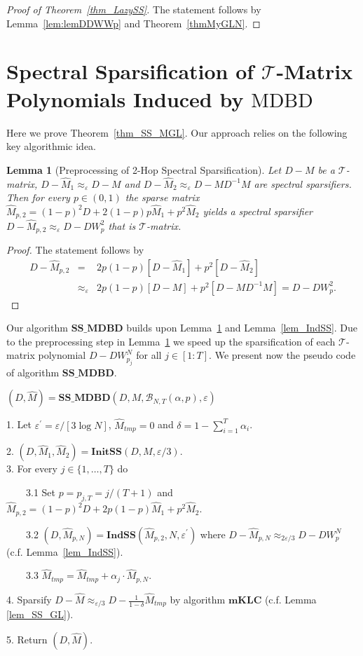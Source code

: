 \documentclass[11pt]{article}
\newcommand{\MDBD}{\mathrm{MDBD}}
\newcommand{\GL}{\mathcal{T}}
\newcommand{\BNTap}{\mathcal{B}_{N,T}(\alpha,p)}
\newcommand{\mKLC}{\mathrm{\mathbf{mKLC}}}
\newcommand{\InitSS}{\mathrm{\mathbf{InitSS}}}
\newcommand{\IndSS}{\mathrm{\mathbf{IndSS}}}
\newcommand{\SSMDBD}{\mathrm{\mathbf{SS\_MDBD}}}
\newcommand{\hM}{\widehat{M}}
\newcommand{\Di}{D^{-1}}
\newcommand{\prm}{\prime}
\newcommand{\eps}{\epsilon}
\newcommand{\lemref}[1]{Lemma~\ref{lem:#1}}
\renewcommand{\eps}{\varepsilon}
\newtheorem{lem}[thm]{Lemma}
\numberwithin{thm}{section}
\begin{document}
\begin{proof}[Proof of Theorem~\ref{thm_LazySS}] The statement follows by \lemref{lemDDWWp} and Theorem~\ref{thmMyGLN}.
\end{proof}


\section{Spectral Sparsification of $\GL$-Matrix Polynomials Induced by $\MDBD$}\label{sec:SSGLBM}

Here we prove Theorem~\ref{thm_SS_MGL}. Our approach relies on the following key algorithmic idea.

\begin{lem}[Preprocessing of 2-Hop Spectral Sparsification]\label{lem_DMp2}
Let $D-M$ be a $\GL$-matrix, $D-\hM_{1}\approx_{\eps}D-M$ and $D-\hM_{2}\approx_{\eps}D-M\Di M$ are spectral sparsifiers. Then for every $p\in(0,1)$ the sparse matrix $\hM_{p,2}=(1-p)^{2}D+2(1-p)p\hM_{1}+p^{2}\hM_{2}$ yields a spectral sparsifier $D-\hM_{p,2}\approx_{\eps}D-DW_{p}^{2}$ that is $\GL$-matrix.
\end{lem}

\begin{proof}
The statement follows by
\begin{eqnarray*}
  D-\hM_{p,2} & = & 2p(1-p)[D-\hM_{1}]+p^{2}[D-\hM_{2}]\\
  & \approx_{\eps} & 2p(1-p)[D-M]+p^{2}[D-M\Di M]=D-DW_{p}^{2}.
\end{eqnarray*}
\end{proof}

Our algorithm $\SSMDBD$ builds upon Lemma~\ref{lem_DMp2} and Lemma~\ref{lem_IndSS}. Due to the preprocessing step in Lemma~\ref{lem_DMp2} we speed up the sparsification of each $\GL$-matrix polynomial $D-DW_{p_j}^{N}$ for all $j\in[1:T]$. We present now the pseudo code of algorithm $\SSMDBD$.

\begin{algorithm}[H]
\caption{}
\label{alg_SSMDBD}

$(D,\hM )=\SSMDBD(D,M,\BNTap,\eps)$

1. Let $\eps^{\prm}=\eps/[3\log N]$, $\hM_{tmp}=0$ and  $\delta=1-\sum_{i=1}^{T}\alpha_i$.

2. $(D,\hM_{1},\hM_{2})=\InitSS(D,M,\eps/3)$.\\
3. For every $j\in\{ 1,\dots,T\} $ do

$\qquad$3.1 Set $p=p_{j,T}=j/(T+1)$ and $\hM_{p,2}=(1-p)^{2}D + 2p(1-p)\hM_{1} + p^{2}\hM_{2}$.

$\qquad$3.2 $(D,\hM_{p,N})=\IndSS(\hM_{p,2},N,\eps^{\prm})$
where $D-\hM_{p,N}\approx_{2\eps/3}D-DW_{p}^{N}$ (c.f. Lemma~\ref{lem_IndSS}).

$\qquad$3.3 $\hM_{tmp}=\hM_{tmp}+\alpha_{j}\cdot\hM_{p,N}$.

4. Sparsify $D-\hM \approx_{\eps/3}D - \frac{1}{1-\delta}\hM_{tmp}$
by algorithm $\mKLC$ (c.f. Lemma \ref{lem_SS_GL}).

5. Return $(D,\hM)$.
\end{algorithm}
\end{document}
